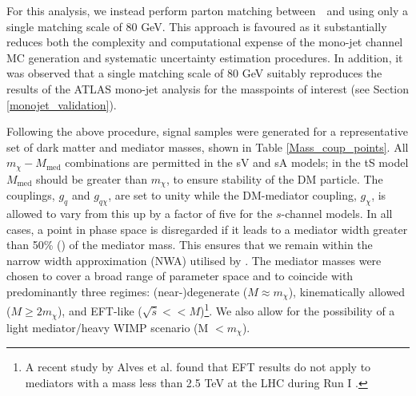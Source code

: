For this analysis, we instead perform parton matching between \MG$\mbox{ }$and \PYTHIA using only a single matching scale of 80 GeV. This approach is favoured as it substantially reduces both the complexity and computational expense of the mono-jet channel MC generation and systematic uncertainty estimation procedures. In addition, it was observed that a single matching scale of 80 GeV suitably reproduces the results of the ATLAS mono-jet analysis for the masspoints of interest (see Section \ref{monojet_validation}).
\bigskip

Following the above procedure, signal samples were generated for a representative set of dark matter and mediator masses, shown in Table \ref{Mass_coup_points}. All $m_{\chi}-M_{\mathrm{med}}$ combinations are permitted in the sV and sA models; in the tS model $M_{\mathrm{med}}$ should be greater than $m_{\chi}$, to ensure stability of the DM particle. The couplings, $g_{q}$ and $g_{q\chi}$, are set to unity while the DM-mediator coupling, $g_{\chi}$, is allowed to vary from this up by a factor of five for the $s$-channel models. In all cases, a point in phase space is disregarded if it leads to a mediator width greater than 50\% () of the mediator mass. This ensures that we remain within the narrow width approximation (NWA) utilised by \MG. The mediator masses were chosen to cover a broad range of parameter space and to coincide with predominantly three regimes: (near-)degenerate ($M\approx m_{\chi}$), kinematically allowed ($M \geq 2m_{\chi}$), and EFT-like ($\sqrt{\hat{s}} << M$)\footnote{A recent study by Alves et al. found that EFT results do not apply to mediators with a mass less than 2.5 TeV at the LHC during Run I \cite{Alves:2011wf}.}. We also allow for the possibility of a light mediator/heavy WIMP scenario (M $<m_{\chi}$).

